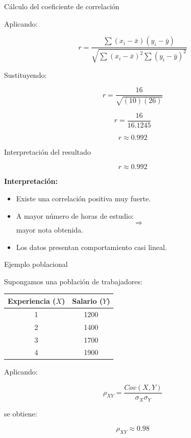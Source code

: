 \documentclass{beamer}
\begin{document}
\begin{frame}{Cálculo del coeficiente de correlación}

Aplicando:

\[
r=
\frac{
\sum (x_i-\bar{x})(y_i-\bar{y})
}{
\sqrt{
\sum (x_i-\bar{x})^2
\sum (y_i-\bar{y})^2
}
}
\]

\vspace{0.4cm}

Sustituyendo:

\[
r=
\frac{16}{\sqrt{(10)(26)}}
\]

\[
r=
\frac{16}{16.1245}
\]

\[
r \approx 0.992
\]

\end{frame}

\begin{frame}{Interpretación del resultado}

\[
r \approx 0.992
\]

\vspace{0.4cm}

\textbf{Interpretación:}

\begin{itemize}
\item Existe una correlación positiva muy fuerte.
\item A mayor número de horas de estudio:
\[
\Rightarrow
\]
mayor nota obtenida.
\item Los datos presentan comportamiento casi lineal.
\end{itemize}

\end{frame}

\begin{frame}{Ejemplo poblacional}

Supongamos una población de trabajadores:

\vspace{0.3cm}

\begin{center}
\begin{tabular}{cc}
\toprule
Experiencia (\(X\)) & Salario (\(Y\)) \\
\midrule
1 & 1200 \\
2 & 1400 \\
3 & 1700 \\
4 & 1900 \\
\bottomrule
\end{tabular}
\end{center}

\vspace{0.4cm}

Aplicando:

\[
\rho_{XY}
=
\frac{
Cov(X,Y)
}{
\sigma_X \sigma_Y
}
\]

\vspace{0.3cm}

se obtiene:

\[
\rho_{XY}\approx0.98
\]

\end{frame}
\end{document}
